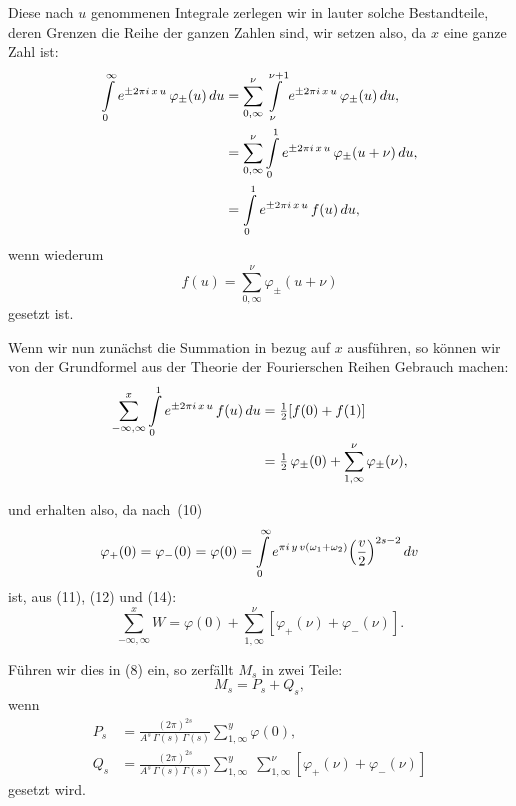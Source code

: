 \documentclass[12pt,a4paper]{article}
\theoremstyle{definition}
\begin{document}
Diese nach $u$ genommenen Integrale zerlegen wir in lauter solche 
Bestandteile, deren Grenzen die Reihe der ganzen Zahlen sind, wir setzen 
also, da $x$ eine ganze Zahl ist:
\begin{align}
\int\limits_{0}^{\infty} e^{\pm 2\pi i\,x\,u}\,\varphi_{\pm}(u)\,du
&= \sum_{0,\infty}^{\nu} \int\limits_{\nu}^{\nu+1}
e^{\pm 2\pi i\,x\,u}\,\varphi_{\pm}(u)\,du,\notag\\
&= \sum_{0,\infty}^{\nu} \int\limits_{0}^{1}
e^{\pm 2\pi i\,x\,u}\,\varphi_{\pm}(u+\nu)\,du,\notag\\
&= \int\limits_{0}^{1} e^{\pm 2\pi i\,x\,u}\,f(u)\,du,
\end{align}
wenn wiederum
\begin{equation}
f(u) = \sum_{0,\infty}^{\nu} \varphi_{\pm}(u+\nu)
\end{equation}
gesetzt ist.

Wenn wir nun zunächst die Summation in bezug auf $x$ ausführen, so können 
wir von der Grundformel aus der Theorie der Fourierschen Reihen Gebrauch 
machen:
\begin{align}
\sum_{-\infty,\infty}^{x} \int\limits_{0}^{1}
e^{\pm 2\pi i\,x\,u}\,f(u)\,du &= \tfrac{1}{2}[f(0) + f(1)]\notag\\
&= \tfrac{1}{2}\,\varphi_{\pm}(0) + \sum_{1,\infty}^{\nu} \varphi_{\pm}(\nu),
\end{align}




und erhalten also, da nach~(10)
\begin{equation}
\varphi_{+}(0) = \varphi_{-}(0) = \varphi(0) =
\int\limits_{0}^{\infty} e^{\pi i\,y\,v(\omega_{1}+\omega_{2})}
\Bigl(\frac{v}{2}\Bigr)^{2s-2}\,dv
\end{equation}
ist, aus (11), (12) und (14):
\begin{equation}
\sum_{-\infty,\infty}^{x} W = \varphi(0) + \sum_{1,\infty}^{\nu}
[\varphi_{+}(\nu) + \varphi_{-}(\nu)].
\end{equation}

Führen wir dies in (8) ein, so zerfällt $M_{s}$ in zwei Teile:
\begin{equation}
M_{s} = P_{s} + Q_{s},
\end{equation}
wenn
\begin{align}
P_{s} &= \frac{(2\pi)^{2s}}{A^{s}\,\Gamma(s)\,\Gamma(s)}
\sum_{1,\infty}^{y} \varphi(0),\\
Q_{s} &= \frac{(2\pi)^{2s}}{A^{s}\,\Gamma(s)\,\Gamma(s)}
\sum_{1,\infty}^{y}\;\sum_{1,\infty}^{\nu}
[\varphi_{+}(\nu) + \varphi_{-}(\nu)]
\end{align}
gesetzt wird.
\end{document}
